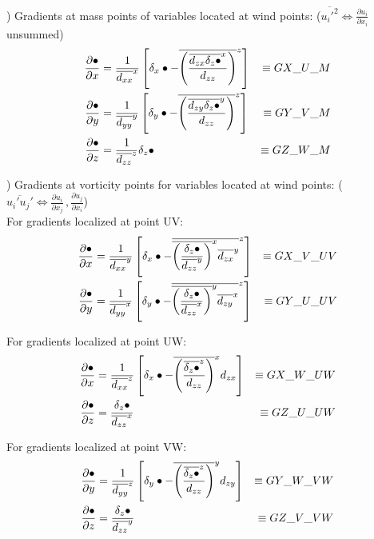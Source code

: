 ) Gradients at mass points of variables located at wind points:
($\overline{u_i'^2} \Longleftrightarrow \frac{\partial u_i}{\partial x_i}$
unsummed)
\begin{eqnarray}
\frac{\partial \bullet}{\partial x}&=
\frac{1}{\overline{d_{xx}}^x}\left[ \delta_x \bullet -
\overline{\left({\overline{d_{zx}\delta_z \bullet}^x \over d_{zz}}\right)}^z
\right]
&\equiv GX\_U\_M
\nonumber\\
\frac{\partial \bullet}{\partial y}&=
\frac{1}{\overline{d_{yy}}^y}\left[ \delta_y \bullet -
\overline{\left({\overline{d_{zy}\delta_z \bullet}^y \over d_{zz}}\right)}^z
\right]
&\equiv GY\_V\_M
\nonumber\\
\frac{\partial \bullet}{\partial z}&=
\frac{1}{\overline{d_{zz}}^z} \delta_z \bullet
&\equiv GZ\_W\_M
\end{eqnarray}

) Gradients at vorticity points for variables located at wind points:
($\overline{u_i'u_j'} \Longleftrightarrow
\frac{\partial u_i}{\partial x_j}\,,\frac{\partial u_j}{\partial x_i}$)\\
For gradients localized at point UV:
\begin{eqnarray}
\frac{\partial \bullet}{\partial x}&=
\frac{1}{\overline{d_{xx}}^y}\left[ \delta_x \bullet -
\overline{\overline{\left({\delta_z\bullet \over \overline{d_{zz}}^y}\right)}^x
\overline{d_{zx}}^y }^z \right]
&\equiv GX\_V\_UV
\nonumber\\
\frac{\partial \bullet}{\partial y}&=
\frac{1}{\overline{d_{yy}}^x}\left[ \delta_y \bullet -
\overline{\overline{\left({\delta_z\bullet \over \overline{d_{zz}}^x}\right)}^y
\overline{d_{zy}}^x }^z \right]
&\equiv GY\_U\_UV
\end{eqnarray}

\noindent
For gradients localized at point UW:
\begin{eqnarray}
\frac{\partial \bullet}{\partial x}&=
\frac{1}{\overline{d_{xx}}^z}\left[ \delta_x \bullet -
\overline{\left({\overline{\delta_z\bullet}^z \over d_{zz}}\right)}^x d_{zx}
\right]
&\equiv GX\_W\_UW
\nonumber\\
\frac{\partial \bullet}{\partial z}&=
\frac{\delta_z\bullet}{\overline{d_{zz}}^x}
&\equiv GZ\_U\_UW
\end{eqnarray}

\noindent
For gradients localized at point VW:
\begin{eqnarray}
\frac{\partial \bullet}{\partial y}&=
\frac{1}{\overline{d_{yy}}^z}\left[ \delta_y \bullet -
\overline{\left({\overline{\delta_z\bullet}^z \over d_{zz}}\right)}^y d_{zy}
\right]
&\equiv GY\_W\_VW
\nonumber\\
\frac{\partial \bullet}{\partial z}&=
\frac{\delta_z\bullet}{\overline{d_{zz}}^y}
&\equiv GZ\_V\_VW
\end{eqnarray}

